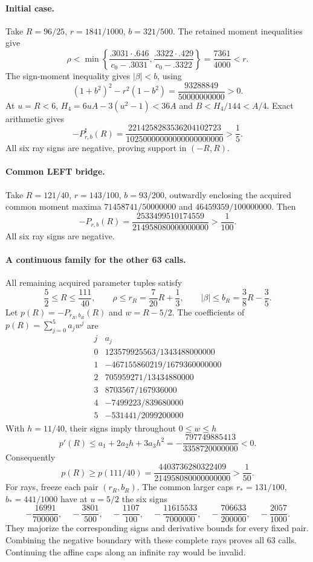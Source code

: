 \documentclass[11pt]{article}
\begin{document}
\paragraph{Initial case.}
Take $R=96/25$, $r=1841/1000$, $b=321/500$. The retained moment inequalities
give
\[
 \rho<
 \min\left\{\frac{.3031\cdot.646}{c_0-.3031},
              \frac{.3322\cdot.429}{c_0-.3322}\right\}
 =\frac{7361}{4000}<r.
\]
The sign-moment inequality gives $|\beta|<b$, using
\[
 (1+b^2)^2-r^2(1-b^2)=\frac{93288849}{50000000000}>0.
\]
At $u=R<6$,
$H_4=6uA-3(u^2-1)<36A$ and $B<H_4/144<A/4$. Exact arithmetic gives
\[
 -P^\sharp_{r,b}(R)=
 \frac{2214258283536204102723}{10250000000000000000000}>\frac15.
\]
All six ray signs are negative, proving support in $(-R,R)$.

\paragraph{Common LEFT bridge.}
Take $R=121/40$, $r=143/100$, $b=93/200$, outwardly enclosing the acquired
common moment maxima $71458741/50000000$ and $46459359/100000000$.
Then
\[
 -P_{r,b}(R)=\frac{2533499510174559}{214958080000000000}>\frac1{100}.
\]
All six ray signs are negative.

\paragraph{A continuous family for the other 63 calls.}
All remaining acquired parameter tuples satisfy
\[
 \frac52\le R\le\frac{111}{40},\qquad
 \rho\le r_R=\frac7{20}R+\frac13,\qquad
 |\beta|\le b_R=\frac38R-\frac35.
\]
Let $p(R)=-P_{r_R,b_R}(R)$ and $w=R-5/2$. The coefficients of
$p(R)=\sum_{j=0}^5a_jw^j$ are
\[
\begin{array}{c|r}
j&a_j\\ \hline
0&123579925563/1343488000000\\
1&-467155860219/1679360000000\\
2&705959271/13434880000\\
3&8703567/167936000\\
4&-7499223/839680000\\
5&-531441/2099200000
\end{array}
\]
With $h=11/40$, their signs imply throughout $0\le w\le h$
\[
 p'(R)\le a_1+2a_2h+3a_3h^2
       =-\frac{797749885413}{3358720000000}<0.
\]
Consequently
\[
 p(R)\ge p(111/40)
       =\frac{4403736280322409}{214958080000000000}>\frac1{50}.
\]
For rays, freeze each pair $(r_R,b_R)$. The common larger caps
$r_*=131/100$, $b_*=441/1000$ have at $u=5/2$ the six signs
\[
 -\frac{16991}{700000},\quad-\frac{3801}{500},\quad-\frac{1107}{100},
 \quad-\frac{11615533}{7000000},\quad-\frac{706633}{200000},
 \quad-\frac{2057}{1000}.
\]
They majorize the corresponding signs and derivative bounds for every fixed
pair. Combining the negative boundary with these complete rays proves all
63 calls. Continuing the affine caps along an infinite ray would be invalid.
\end{document}
